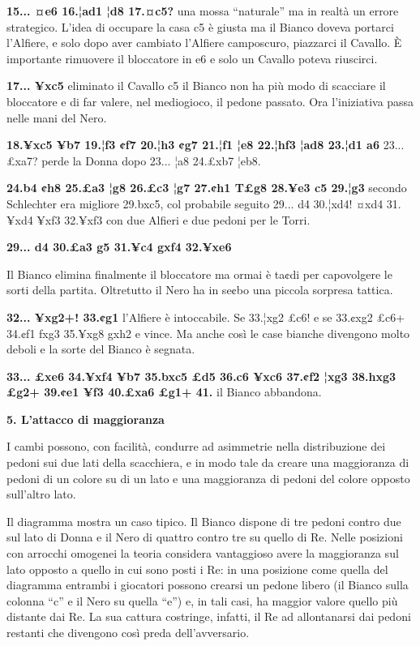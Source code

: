 \textbf{15... ¤e6 16.¦ad1 ¦d8 17.¤c5?} una mossa ``naturale'' ma in
realtà un errore strategico. L'idea di occupare la casa c5 è giusta ma
il Bianco doveva portarci l'Alfiere, e solo dopo aver cambiato l'Alfiere
camposcuro, piazzarci il Cavallo. È importante rimuovere il bloccatore
in e6 e solo un Cavallo poteva riuscirci.

\textbf{17... ¥xc5} eliminato il Cavallo c5 il Bianco non ha più modo di
scacciare il bloccatore e di far valere, nel mediogioco, il pedone
passato. Ora l'iniziativa passa nelle mani del Nero.

\textbf{18.¥xc5 ¥b7 19.¦f3 ¢f7 20.¦h3 ¢g7 21.¦f1 ¦e8 22.¦hf3 ¦ad8 23.¦d1
a6} 23... £xa7? perde la Donna dopo 23... ¦a8 24.£xb7 ¦eb8.

\textbf{24.b4 ¢h8 25.£a3 ¦g8 26.£c3 ¦g7 27.¢h1 T£g8 28.¥e3 c5 29.¦g3}
secondo Schlechter era migliore 29.bxc5, col probabile seguito 29... d4
30.¦xd4! ¤xd4 31.¥xd4 ¥xf3 32.¥xf3 con due Alfieri e due pedoni per le
Torri.

\textbf{29... d4 30.£a3 g5 31.¥c4 gxf4 32.¥xe6}


Il Bianco elimina finalmente il bloccatore ma ormai è ta¢di per
capovolgere le sorti della partita. Oltretutto il Nero ha in se¢bo una
piccola sorpresa tattica.

\textbf{32... ¥xg2+! 33.¢g1} l'Alfiere è intoccabile. Se 33.¦xg2 £c6! e
se 33.¢xg2 £c6+ 34.¢f1 fxg3 35.¥xg8 gxh2 e vince. Ma anche così le case
bianche divengono molto deboli e la sorte del Bianco è segnata.

\textbf{33... £xe6 34.¥xf4 ¥b7 35.bxc5 £d5 36.c6 ¥xc6 37.¢f2 ¦xg3
38.hxg3 £g2+ 39.¢e1 ¥f3 40.£xa6 £g1+ 41.} il Bianco abbandona.

\textbf{5. L'attacco di maggioranza}

I cambi possono, con facilità, condurre ad asimmetrie nella
distribuzione dei pedoni sui due lati della scacchiera, e in modo tale
da creare una maggioranza di pedoni di un colore su di un lato e una
maggioranza di pedoni del colore opposto sull'altro lato.


Il diagramma mostra un caso tipico. Il Bianco dispone di tre pedoni
contro due sul lato di Donna e il Nero di quattro contro tre su quello
di Re. Nelle posizioni con arrocchi omogenei la teoria considera
vantaggioso avere la maggioranza sul lato opposto a quello in cui sono
posti i Re: in una posizione come quella del diagramma entrambi i
giocatori possono crearsi un pedone libero (il Bianco sulla colonna
``c'' e il Nero su quella ``e'') e, in tali casi, ha maggior valore
quello più distante dai Re. La sua cattura costringe, infatti, il Re ad
allontanarsi dai pedoni restanti che divengono così preda
dell'avversario.

